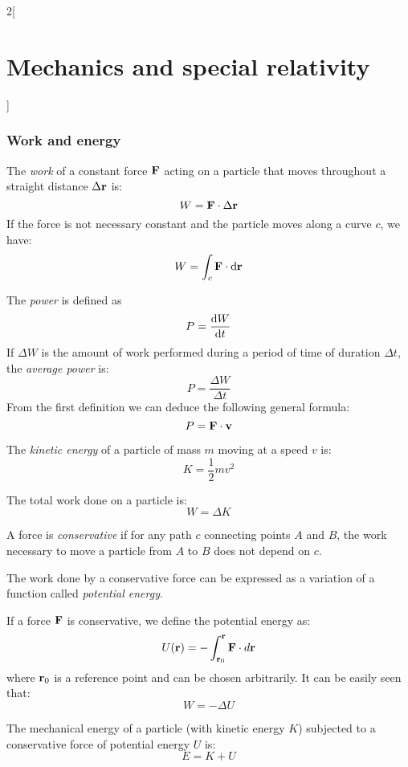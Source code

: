 \documentclass[../../../main.tex]{subfiles}
\begin{document}
\begin{multicols}{2}[\section{Mechanics and special relativity}]
  \subsubsection*{Work and energy}
  \begin{definition}[Work]
    The \textit{work} of a constant force $\vb{F}$ acting on a particle that moves throughout a straight distance $\Delta\vb{r}$ is: $$ W=\vb{F}\cdot\Delta\vb{r}$$ If the force is not necessary constant and the particle moves along a curve $c$, we have: $$W=\int_c\vb{F}\cdot \dd\vb{r}$$
  \end{definition}
  \begin{definition}[Power]
    The \textit{power} is defined as $$P=\dv{W}{t}$$ If $\Delta W$ is the amount of work performed during a period of time of duration $\Delta t$, the \textit{average power} is: $$P=\frac{\Delta W}{\Delta t}$$ From the first definition we can deduce the following general formula: $$P=\vb{F}\cdot\vb{v}$$
  \end{definition}
  \begin{definition}
    The \textit{kinetic energy} of a particle of mass $m$ moving at a speed $v$ is: $$K=\frac{1}{2}mv^2$$
  \end{definition}
  \begin{theorem}
    The total work done on a particle is:
    $$W=\Delta K$$
  \end{theorem}
  \begin{definition}
    A force is \textit{conservative} if for any path $c$ connecting points $A$ and $B$, the work necessary to move a particle from $A$ to $B$ does not depend on $c$.
  \end{definition}
  \begin{prop}
    The work done by a conservative force can be expressed as a variation of a function called \textit{potential energy}.
  \end{prop}
  \begin{prop}
    If a force $\vb{F}$ is conservative, we define the potential energy as: $$U(\vb{r})=-\int_{\vb{r}_0}^{\vb{r}}\vb{F}\cdot d\vb{r}$$ where $\vb{r}_0$ is a reference point and can be chosen arbitrarily. It can be easily seen that: $$W=-\Delta U$$
  \end{prop}
  \begin{prop}
    The mechanical energy of a particle (with kinetic energy $K$) subjected to a conservative force of potential energy $U$ is: $$E=K+U$$

\end{prop}
\end{multicols}
\end{document}
